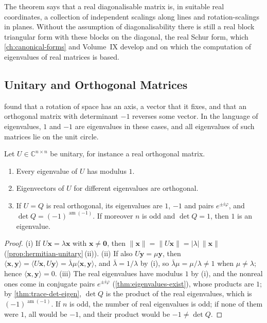 The theorem says that a real diagonalisable matrix is, in suitable real coordinates, a collection of independent scalings along lines and rotation-scalings in planes. Without the assumption of diagonalisability there is still a real block triangular form with these blocks on the diagonal, the real Schur form, which \cref{ch:canonical-forms} and Volume~IX develop and on which the computation of eigenvalues of real matrices is based.

\subsection{Unitary and Orthogonal Matrices}

 found that a rotation of space has an axis, a vector that it fixes, and that an orthogonal matrix with determinant $-1$ reverses some vector. In the language of eigenvalues, $1$ and $-1$ are eigenvalues in these cases, and all eigenvalues of such matrices lie on the unit circle.

\begin{proposition}
\label{prop:unitary-eigen}
Let $U\in\mathbb C^{n\times n}$ be unitary, for instance a real orthogonal matrix.
\begin{enumerate}
\item Every eigenvalue of $U$ has modulus $1$.
\item Eigenvectors of $U$ for different eigenvalues are orthogonal.
\item If $U=Q$ is real orthogonal, its eigenvalues are $1$, $-1$ and pairs $e^{\pm i\varphi}$, and $\det Q=(-1)^{\operatorname{am}(-1)}$. If moreover $n$ is odd and $\det Q=1$, then $1$ is an eigenvalue.
\end{enumerate}
\end{proposition}

\begin{proof}
(i) If $U\mathbf x=\lambda\mathbf x$ with $\mathbf x\ne\mathbf 0$, then $\|\mathbf x\|=\|U\mathbf x\|=|\lambda|\,\|\mathbf x\|$ (\cref{prop:hermitian-unitary}\,(ii)). (ii) If also $U\mathbf y=\mu\mathbf y$, then $\langle\mathbf x,\mathbf y\rangle=\langle U\mathbf x,U\mathbf y\rangle=\bar\lambda\mu\langle\mathbf x,\mathbf y\rangle$, and $\bar\lambda=1/\lambda$ by (i), so $\bar\lambda\mu=\mu/\lambda\ne1$ when $\mu\ne\lambda$; hence $\langle\mathbf x,\mathbf y\rangle=0$. (iii) The real eigenvalues have modulus $1$ by (i), and the nonreal ones come in conjugate pairs $e^{\pm i\varphi}$ (\cref{thm:eigenvalues-exist}), whose products are $1$; by \cref{thm:trace-det-eigen}, $\det Q$ is the product of the real eigenvalues, which is $(-1)^{\operatorname{am}(-1)}$. If $n$ is odd, the number of real eigenvalues is odd; if none of them were $1$, all would be $-1$, and their product would be $-1\ne\det Q$.
\end{proof}

